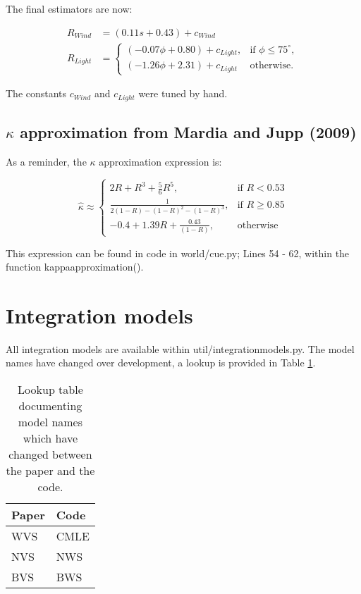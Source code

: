 \documentclass[10pt, a4paper]{article}
\begin{document}
The final estimators are now:

\begin{align}
  R_{Wind} &= (0.11s + 0.43) + c_{Wind}\\
  R_{Light} &=
  \begin{cases}
    (-0.07\phi + 0.80) + c_{Light}, &\text{if } \phi \leq 75^\circ,\\
    (-1.26\phi + 2.31) + c_{Light} &\text{otherwise.}
  \end{cases}
\end{align}

The constants $c_{Wind}$ and $c_{Light}$ were tuned by hand.

\subsection{$\kappa$ approximation from Mardia and Jupp (2009)}
As a reminder, the $\kappa$ approximation expression is:

\begin{equation} \label{eq:kappaapprox}
\hat\kappa \approx
\begin{cases}
  2R + R^3 + \frac{5}{6}R^5, &\text{if } R < 0.53\\
  \frac{1}{2(1 - R) - (1 - R)^2 - (1-R)^3}, &\text{if } R \geq 0.85\\
  -0.4 + 1.39R + \frac{0.43}{(1-R)}, &\text{otherwise}
\end{cases}
\end{equation}

This expression can be found in code in world/cue.py; Lines 54 - 62,
within the function \textunderscore\textunderscore
kappa\textunderscore approximation().

\section{Integration models}
All integration models are available within
util/integration\textunderscore models.py. The model names have
changed over development, a lookup is provided in Table \ref{tab:lookup}.

\begin{table}[htp!]
  \centering
  \caption{\label{tab:lookup} Lookup table documenting model names which
    have changed between the paper and the code.}
  \vspace{5px}
  \begin{tabular}{|l|l|}
    \hline
    \textbf{Paper} & \textbf{Code} \\ \hline
    WVS            & CMLE          \\ \hline
    NVS            & NWS           \\ \hline
    BVS            & BWS           \\ \hline
  \end{tabular}
\end{table}
\end{document}
